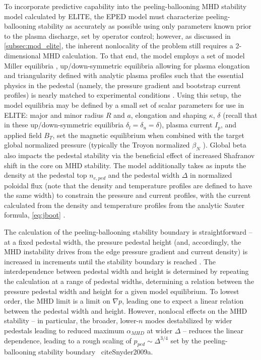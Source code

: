 To incorporate predictive capability into the peeling-ballooning MHD stability model calculated by ELITE, the EPED model must characterize peeling-ballooning stability as accurately as possible using only parameters known prior to the plasma discharge, set by operator control; however, as discussed in \cref{subsec:mod_elite}, the inherent nonlocality of the problem still requires a 2-dimensional MHD calculation.  To that end, the model employs a set of model Miller equilibria \cite{Miller1998}, up/down-symmetric equilibria allowing for plasma elongation and triangularity defined with analytic plasma profiles such that the essential physics in the pedestal (namely, the pressure gradient and bootstrap current profiles) is nearly matched to experimental conditions \cite{Snyder2009}.  Using this setup, the model equilibria may be defined by a small set of scalar parameters for use in ELITE: major and minor radius $R$ and $a$, elongation and shaping $\kappa$, $\delta$ (recall that in these up/down-symmetric 
equilibria $\delta_l = \delta_u = \delta$), plasma current $I_p$, and applied field $B_T$, set the magnetic equilibrium when combined with the target global normalized pressure (typically the Troyon normalized $\beta_N$ \cite{Troyon1984}).  Global beta also impacts the pedestal stability via the beneficial effect of increased Shafranov shift in the core on MHD stability.  The model additionally takes as inputs the density at the pedestal top $n_{e,ped}$ and the pedestal width $\Delta$ in normalized poloidal flux (note that the density and temperature profiles are defined to have the same width) to constrain the pressure and current profiles, with the current calculated from the density and temperature profiles from the analytic Sauter formula, \cref{eq:jboot} \cite{Sauter1999}.

The calculation of the peeling-ballooning stability boundary is straightforward -- at a fixed pedestal width, the pressure pedestal height (and, accordingly, the MHD instability drives from the edge pressure gradient and current density) is increased in increments until the stability boundary is reached \cite{Snyder2009}.  The interdependence between pedestal width and height is determined by repeating the calculation at a range of pedestal widths, determining a relation between the pressure pedestal width and height for a given model equilibrium.  To lowest order, the MHD limit is a limit on $\nabla p$, leading one to expect a linear relation between the pedestal width and height.  However, nonlocal effects on the MHD stability -- in particular, the broader, lower-$n$ modes destabilized by wider pedestals leading to reduced maximum $\alpha_{MHD}$ at wider $\Delta$ -- reduces the linear dependence, leading to a rough scaling of $p_{ped} \sim \Delta^{3/4}$ set by the peeling-ballooning stability boundary \
cite{Snyder2009a}.

